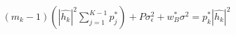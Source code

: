 \documentclass[preview]{standalone}
\begin{document}
\begin{align*}
\left(m_k-1\right) \left(\left|\hat{h_k}\right|^2 \sum_{j=1}^{K-1} {p_j^\ast}\right) + P \sigma_{\epsilon}^2 + w_B^\ast \sigma^2 = p_k^\ast \left|\hat{h_k}\right|^2
\end{align*}
\end{document}
